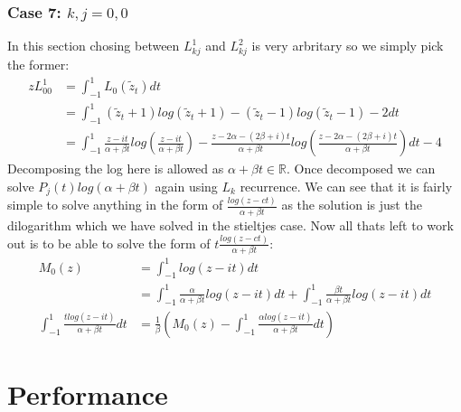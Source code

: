 \documentclass{article}
\begin{document}
\subsubsection{Case 7: $k,j=0,0$}
\label{case_l00}
In this section chosing between $L_{kj}^1$ and $L_{kj}^2$ is very arbritary so we simply pick the former:
\begin{align}
    zL_{00}^1 &= \int_{-1}^1L_0(\tilde z_t)dt\\
    &=\int_{-1}^1 (\tilde z_t+1)log(\tilde z_t+1)-(\tilde z_t-1)log(\tilde z_t-1)-2dt\\
    &=\int_{-1}^1 \frac{z-it}{\alpha+\beta t}log(\frac{z-it}{\alpha+\beta t})-\frac{z-2\alpha-(2\beta+i)t}{\alpha+\beta t}log(\frac{z-2\alpha-(2\beta+i)t}{\alpha+\beta t})dt-4
\end{align}
Decomposing the log here is allowed as $\alpha+\beta t\in\mathbb{R}$.
Once decomposed we can solve $P_j(t)log(\alpha+\beta t)$ again using $L_k$ recurrence.
We can see that it is fairly simple to solve anything in the form of $\frac{log(z-ct)}{\alpha+\beta t}$ as the solution is just the dilogarithm which we have solved in the stieltjes case.
Now all thats left to work out is to be able to solve the form of $t\frac{log(z-ct)}{\alpha+\beta t}$:
\begin{align}
    M_0(z)&=\int_{-1}^1log(z-it)dt\\
    &=\int_{-1}^1\frac{\alpha}{\alpha+\beta t}log(z-it)dt+\int_{-1}^1\frac{\beta t}{\alpha+\beta t}log(z-it)dt\\
    \int_{-1}^1\frac{tlog(z-it)}{\alpha+\beta t}dt&=\frac{1}{\beta}(M_0(z)-\int_{-1}^1\frac{\alpha log(z-it)}{\alpha+\beta t}dt)
\end{align}

\section{Performance}
\end{document}
